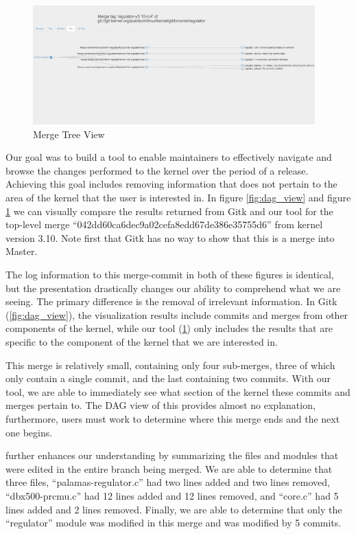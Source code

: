 \documentclass[conference, draftclsnofoot, draft]{IEEEtran}
\begin{document}
\begin{figure}
        \centering
        \includegraphics[width=0.97\textwidth]{figures/042dd_tree.png}
        \caption{Merge Tree View }
        \label{fig:tree_view}
\end{figure}

Our goal was to build a tool to enable maintainers to effectively navigate and browse
the changes performed to the kernel over the period of a release.
Achieving this goal includes removing information that does not pertain to the area
of the kernel that the user is interested in. In figure \ref{fig:dag_view} and
figure \ref{fig:tree_view} we can visually compare the results returned from Gitk
and our tool for the top-level merge ``042dd60ca6dec9a02cefa8edd67de386e35755d6''
from kernel version 3.10. Note first that Gitk has no way to show that this is a merge into Master.

The log information to this merge-commit in both of these
figures is identical, but the presentation drastically changes our ability to
comprehend what we are seeing. The primary difference is the removal of irrelevant
information. In Gitk (\ref{fig:dag_view}), the visualization results include commits
and merges from other components of the kernel, while our tool (\ref{fig:tree_view})
only includes the results that are specific to the component of the kernel that we
are interested in.

This merge is relatively small, containing only four sub-merges, three of which
only contain a single commit, and the last containing two commits. With our
tool, we are able to immediately see what section of the kernel these commits and merges pertain to. The DAG view of this provides almost no explanation,
furthermore, users must work to determine where this merge ends and the next one
begins.

\tool further enhances our understanding by summarizing the files
and modules that were edited in the entire branch being merged. We are able to determine that three
files, ``palamas-regulator.c'' had two lines added and two lines removed,
``dbx500-prcmu.c'' had 12 lines added and 12 lines removed, and ``core.c'' had 5
lines added and 2 lines removed. Finally, we are able to determine that only the
``regulator'' module was modified in this merge and was modified by 5 commits.
\end{document}
